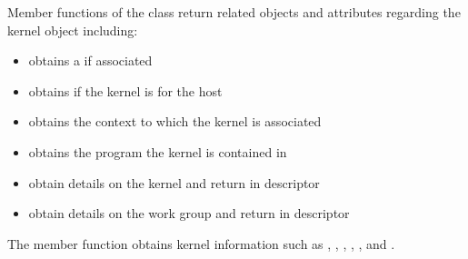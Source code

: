 \documentclass[letterpaper,10pt,english]{sphinxmanual}
\begin{document}
Member functions of the class return related objects and attributes
regarding the kernel object including:
\begin{itemize}
\item {} 
 \textendash{} obtains a  if associated

\item {} 
 \textendash{} obtains if the kernel is for the host

\item {} 
 \textendash{} obtains the context to which the kernel is
associated

\item {} 
 \textendash{} obtains the program the kernel is contained in

\item {} 
 \textendash{} obtain details on the kernel and return in
 descriptor

\item {} 
 \textendash{} obtain details on the work group and return
in  descriptor

\end{itemize}

The  member function obtains kernel information such as
, , , ,
, and .
\end{document}
